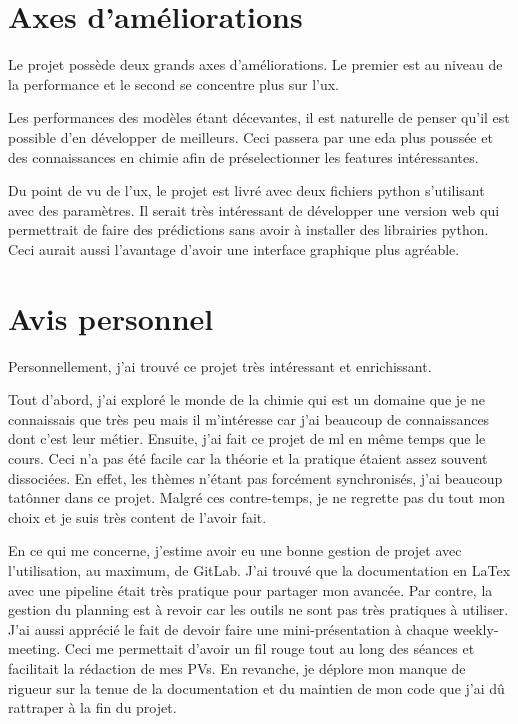 \section{Axes d'améliorations}
Le projet possède deux grands axes d'améliorations. Le premier est au niveau de la performance et le second se concentre plus sur l'\acrlong{ux}.

Les performances des modèles étant décevantes, il est naturelle de penser qu'il est possible d'en développer de meilleurs.
Ceci passera par une \acrlong{eda} plus poussée et des connaissances en chimie afin de préselectionner les features intéressantes.

Du point de vu de l'\acrshort{ux}, le projet est livré avec deux fichiers\cite{data_processor}\cite{fusion_perdictor} python s'utilisant avec des paramètres. 
Il serait très intéressant de développer une version web qui permettrait de faire des prédictions sans avoir à installer des librairies python.
Ceci aurait aussi l'avantage d'avoir une interface graphique plus agréable.

\section{Avis personnel}
Personnellement, j'ai trouvé ce projet très intéressant et enrichissant.

Tout d'abord, j'ai exploré le monde de la chimie qui est un domaine que je ne connaissais que très peu mais il m'intéresse car j'ai beaucoup de connaissances dont c'est leur métier.
Ensuite, j'ai fait ce projet de \acrlong{ml} en même temps que le cours. Ceci n'a pas été facile car la théorie et la pratique étaient assez souvent dissociées.
En effet, les thèmes n'étant pas forcément synchronisés, j'ai beaucoup tatônner dans ce projet.
Malgré ces contre-temps, je ne regrette pas du tout mon choix et je suis très content de l'avoir fait.

En ce qui me concerne, j'estime avoir eu une bonne gestion de projet avec l'utilisation, au maximum, de GitLab.
J'ai trouvé que la documentation en LaTex avec une pipeline était très pratique pour partager mon avancée.
Par contre, la gestion du planning est à revoir car les outils ne sont pas très pratiques à utiliser.
J'ai aussi apprécié le fait de devoir faire une mini-présentation à chaque weekly-meeting.
Ceci me permettait d'avoir un fil rouge tout au long des séances et facilitait la rédaction de mes PVs.
En revanche, je déplore mon manque de rigueur sur la tenue de la documentation et du maintien de mon code que j'ai dû rattraper à la fin du projet.
